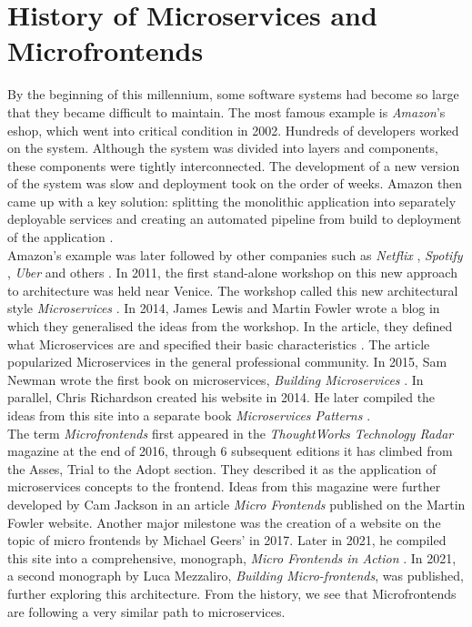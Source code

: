 \section{History of Microservices and Microfrontends}
By the beginning of this millennium, some software systems had become so large that they became difficult to maintain. The most famous example is \emph{Amazon}'s \cite{Amazon} eshop, which went into critical condition in 2002. Hundreds of developers worked on the system. Although the system was divided into layers and components, these components were tightly interconnected. The development of a new version of the system was slow and deployment took on the order of weeks. Amazon then came up with a key solution: splitting the monolithic application into separately deployable services and creating an automated pipeline from build to deployment of the application \cite{Brigham}. \\

\noindent
Amazon's example was later followed by other companies such as \emph{Netflix} \cite{Netflix}, \emph{Spotify} \cite{Spotify}, \emph{Uber} \cite{Uber} and others \cite{Kwiecień}. In 2011, the first stand-alone workshop on this new approach to architecture was held near Venice. The workshop called this new architectural style \emph{Microservices} \cite{Fowler}. In 2014, James Lewis and Martin Fowler wrote a blog in which they generalised the ideas from the workshop. In the article, they defined what Microservices are and specified their basic characteristics \cite{Fowler}. The article popularized Microservices in the general professional community. In 2015, Sam Newman wrote the first book on microservices, \emph{Building Microservices} \cite{NewmanBuildingMs}. In parallel, Chris Richardson created his website \cite{RichardsonWeb} in 2014. He later compiled the ideas from this site into a separate book \emph{Microservices Patterns} \cite{RichardsonPatterns}. \\

\noindent
The term \emph{Microfrontends} first appeared in the \emph{ThoughtWorks Technology Radar} magazine \cite{ThoughtWorksRadar} at the end of 2016, through 6 subsequent editions it has climbed from the Asses, Trial to the Adopt section. They described it as the application of microservices concepts to the frontend. Ideas from this magazine were further developed by Cam Jackson in an article \emph{Micro Frontends} published on the Martin Fowler website. Another major milestone was the creation of a website on the topic of micro frontends by Michael Geers' \cite{GeersWeb} in 2017. Later in 2021, he compiled this site into a comprehensive, monograph, \emph{Micro Frontends in Action} \cite{Geers}. In 2021, a second monograph by Luca Mezzaliro, \emph{Building Micro-frontends}, was published, further exploring this architecture. From the history, we see that Microfrontends are following a very similar path to microservices.
